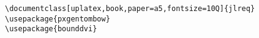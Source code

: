 \documentclass[uplatex,book,paper=a5,fontsize=10Q]{jlreq}
\begin{document}
\begin{verbatim}
\documentclass[uplatex,book,paper=a5,fontsize=10Q]{jlreq}
\usepackage{pxgentombow}
\usepackage{bounddvi}
\end{verbatim}
\end{document}
